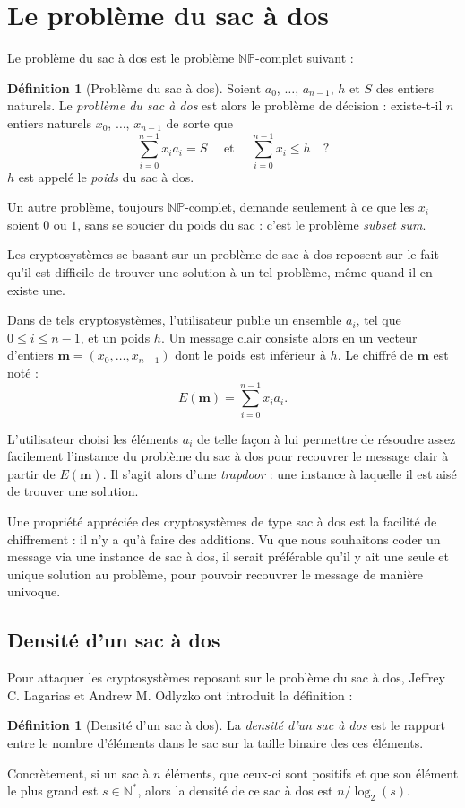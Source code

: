 \documentclass[a4paper, titlepage]{article}
\theoremstyle{definition}
\newtheorem{defi}[theo]{Définition}
\theoremstyle{remark}
\def\N{\mathbb N}
\def\mbf#1{\mathbf{#1}}
\def\NP{\mathbb{NP}}
\begin{document}
\section{Le problème du sac à dos}
Le problème du sac à dos est le problème $\NP$-complet suivant :
\begin{defi}[Problème du sac à dos]
Soient $a_0$, $\dots$, $a_{n-1}$, $h$ et $S$ des entiers naturels. Le \textit{problème du sac à dos} est alors le problème de décision : existe-t-il $n$ entiers naturels $x_0$, $\dots$, $x_{n-1}$ de sorte que 
$$\sum_{i = 0}^{n-1} x_ia_i = S \quad\text{ et }\quad \sum_{i = 0}^{n-1} x_i \leqslant h \quad ?$$
$h$ est appelé le \textit{poids} du sac à dos.
\end{defi}

Un autre problème, toujours $\NP$-complet, demande seulement à ce que les $x_i$ soient $0$ ou $1$, sans se soucier du poids du sac : c'est le problème \textit{subset sum}.

Les cryptosystèmes se basant sur un problème de sac à dos reposent sur le fait qu'il est difficile de trouver une solution à un tel problème, même quand il en existe une. 

Dans de tels cryptosystèmes, l'utilisateur publie un ensemble $a_i$, tel que $0 \leqslant i \leqslant n-1$, et un poids $h$. Un message clair consiste alors en un vecteur d'entiers $\mbf m = (x_0, \dots, x_{n-1})$ dont le poids est inférieur à $h$. Le chiffré de $\mbf m$ est noté :
$$E(\mbf m) = \sum_{i=0}^{n-1} x_ia_i.$$

L'utilisateur choisi les éléments $a_i$ de telle façon à lui permettre de résoudre assez facilement l'instance du problème du sac à dos pour recouvrer le message clair à partir de $E(\mbf m)$. Il s'agit alors d'une \textit{trapdoor} : une instance à laquelle il est aisé de trouver une solution.

Une propriété appréciée des cryptosystèmes de type sac à dos  est la facilité de chiffrement : il n'y a qu'à faire des additions. Vu que nous souhaitons coder un message via une instance de sac à dos, il serait préférable qu'il y ait une seule et unique solution au problème, pour pouvoir recouvrer le message de manière univoque.

\subsection{Densité d'un sac à dos}
Pour attaquer les cryptosystèmes reposant sur le problème du sac à dos, Jeffrey C. Lagarias et Andrew M. Odlyzko ont introduit la définition :
\begin{defi}[Densité d'un sac à dos]
La \textit{densité d'un sac à dos} est le rapport entre le nombre d'éléments dans le sac sur la taille binaire des ces éléments.
\end{defi}
Concrètement, si un sac à $n$ éléments, que ceux-ci sont positifs et que son élément le plus grand est $s \in \N^*$, alors la densité de ce sac à dos est $n/\log_2(s)$.
\end{document}
